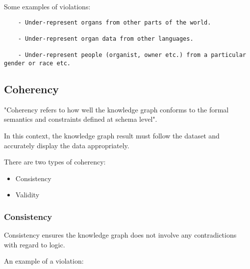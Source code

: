 Some examples of violations: 
\begin{lstlisting}
    - Under-represent organs from other parts of the world.
    
    - Under-represent organ data from other languages.

    - Under-represent people (organist, owner etc.) from a particular gender or race etc.
\end{lstlisting}

\subsection{Coherency}
\hspace{0.5cm} "Coherency refers to how well the knowledge graph conforms to the formal semantics and constraints defined at schema level". \cite{knowledgegraphevaulationbook}

In this context, the knowledge graph result must follow the dataset and accurately display the data appropriately. 

There are two types of coherency:
\begin{itemize}
    \itemsep0em 
\item Consistency
\item Validity
\end{itemize}

\subsubsection{Consistency}
\hspace{0.5cm} Consistency ensures the knowledge graph does not involve any contradictions with regard to logic. \cite{knowledgegraphevaulationbook}

An example of a violation: 
\begin{center}
\end{center}

\begin{center}
\end{center}


